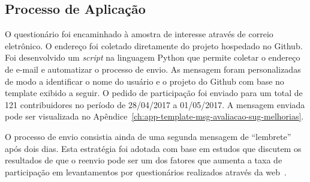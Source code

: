 \subsection{Processo de Aplicação}
\label{ssub:processo_de_aplicação}

O questionário foi encaminhado à amostra de interesse através de correio
eletrônico. O endereço foi coletado diretamente do projeto hospedado no Github.
Foi desenvolvido um \textit{script} na linguagem Python que permite coletar o
endereço de e-mail e automatizar o processo de envio. As mensagem foram
personalizadas de modo a identificar o nome do usuário e o projeto do Github
com base no template exibido a seguir. O pedido de participação foi enviado
para um total de 121 contribuidores no período de 28/04/2017 a 01/05/2017. A
mensagem enviada pode ser visualizada no
Apêndice~\ref{ch:app-template-msg-avaliacao-sug-melhorias}.







O processo de envio consistia ainda de uma segunda mensagem de ``lembrete'' após
dois dias. Esta estratégia foi adotada com base em estudos que discutem os
resultados de que o reenvio pode ser um dos fatores que aumenta a taxa de
participação em levantamentos por questionários realizados através da
web~\cite{fan2010factors}.


